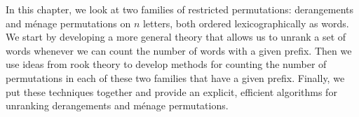 In this chapter, we look at two families of restricted permutations:
derangements and m\'enage permutations on $n$ letters, both ordered
lexicographically as words.
We start by developing a more general theory that allows us to unrank a set
of words whenever we can count the number of words with a given prefix.
Then we use ideas from rook theory to develop methods for counting the number
of permutations in each of these two families that have a given prefix.
Finally, we put these techniques together and provide an explicit, efficient
algorithms for unranking derangements and m\'enage permutations.


